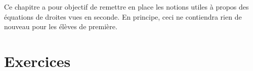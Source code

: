 

Ce chapitre a pour objectif de remettre en place les notions utiles à propos des équations de droites vues en seconde. En principe, ceci ne contiendra rien de nouveau pour les élèves de première.


\section{Exercices}


